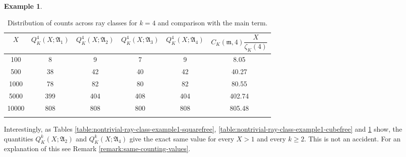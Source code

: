 \documentclass[11pt, reqno]{amsart}
\numberwithin{equation}{section}
\theoremstyle{definition}
\newtheorem{example}[theorem]{Example}
\begin{document}
\begin{example}
\begin{table}[h!]
\centering
\renewcommand{\arraystretch}{1.4}
\begin{tabular}{c c c c c c}
\toprule
$X$ & $Q_K^{4}(X; \mathfrak{A}_1)$ & $Q_K^{4}(X; \mathfrak{A}_2)$ & $Q_K^{4}(X; \mathfrak{A}_3)$ & $Q_K^{4}(X; \mathfrak{A}_4)$ & $C_K(\mathfrak{m}, 4) \dfrac{X}{\zeta_K(4)}$ \\
\midrule
100   & 8   & 9   & 7   & 9   & 8.05 \\
500   & 38  & 42  & 40  & 42  & 40.27 \\
1000  & 78  & 82  & 80  & 82  & 80.55 \\
5000  & 399 & 404 & 408 & 404 & 402.74 \\
10000 & 808 & 808 & 800 & 808 & 805.48 \\
\bottomrule\\
\end{tabular}
\caption{Distribution of counts across ray classes for $k=4$ and comparison with the main term.}
\label{table:nontrivial-ray-class-example1-fourthfree}
\end{table}


Interestingly, as Tables \ref{table:nontrivial-ray-class-example1-squarefree}, \ref{table:nontrivial-ray-class-example1-cubefree} and \ref{table:nontrivial-ray-class-example1-fourthfree} show, the quantities $Q_K^{k}(X; \mathfrak{A}_2)$ and $Q_K^{k}(X; \mathfrak{A}_4)$ give the exact same value for every $X>1$ and every $k \geq 2$. This is not an accident. For an explanation of this see Remark \ref{remark:same-counting-values}.


\begin{figure}[h!]
\centering
{}
\end{figure}
\end{example}
\end{document}
